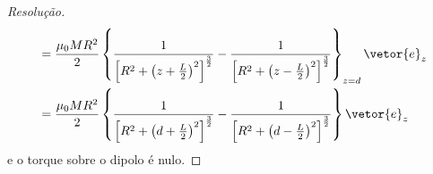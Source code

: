 \begin{proof}[Resolução]
\begin{align*}
                  &= \frac{\mu_0 M R^2}{2}\left\{\frac{1}{\left[R^2 + \left(z + \frac{L}{2}\right)^2\right]^{\frac32}} - \frac{1}{\left[R^2 + \left(z - \frac{L}{2}\right)^2\right]^{\frac32}}\right\}_{z = d}\vetor{e}_z\\
                  &= \frac{\mu_0 M R^2}{2}\left\{\frac{1}{\left[R^2 + \left(d + \frac{L}{2}\right)^2\right]^{\frac32}} - \frac{1}{\left[R^2 + \left(d - \frac{L}{2}\right)^2\right]^{\frac32}}\right\}\vetor{e}_z
    \end{align*}
    e o torque sobre o dipolo é nulo.
\end{proof}
